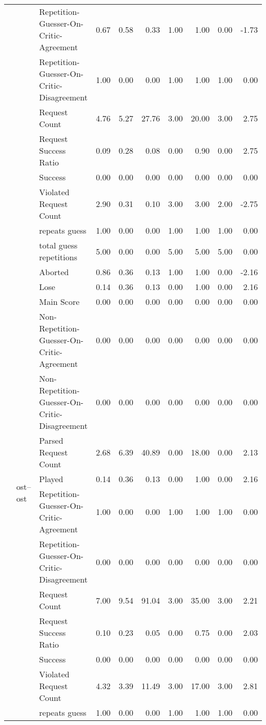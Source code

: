 \begin{tabular}{lllrrrrrrr}
 &  & Repetition-Guesser-On-Critic-Agreement & 0.67 & 0.58 & 0.33 & 1.00 & 1.00 & 0.00 & -1.73 \\
 &  & Repetition-Guesser-On-Critic-Disagreement & 1.00 & 0.00 & 0.00 & 1.00 & 1.00 & 1.00 & 0.00 \\
 &  & Request Count & 4.76 & 5.27 & 27.76 & 3.00 & 20.00 & 3.00 & 2.75 \\
 &  & Request Success Ratio & 0.09 & 0.28 & 0.08 & 0.00 & 0.90 & 0.00 & 2.75 \\
 &  & Success & 0.00 & 0.00 & 0.00 & 0.00 & 0.00 & 0.00 & 0.00 \\
 &  & Violated Request Count & 2.90 & 0.31 & 0.10 & 3.00 & 3.00 & 2.00 & -2.75 \\
 &  & repeats guess & 1.00 & 0.00 & 0.00 & 1.00 & 1.00 & 1.00 & 0.00 \\
 &  & total guess repetitions & 5.00 & 0.00 & 0.00 & 5.00 & 5.00 & 5.00 & 0.00 \\
\cline{2-10}
 & \multirow[t]{15}{*}{ost--ost} & Aborted & 0.86 & 0.36 & 0.13 & 1.00 & 1.00 & 0.00 & -2.16 \\
 &  & Lose & 0.14 & 0.36 & 0.13 & 0.00 & 1.00 & 0.00 & 2.16 \\
 &  & Main Score & 0.00 & 0.00 & 0.00 & 0.00 & 0.00 & 0.00 & 0.00 \\
 &  & Non-Repetition-Guesser-On-Critic-Agreement & 0.00 & 0.00 & 0.00 & 0.00 & 0.00 & 0.00 & 0.00 \\
 &  & Non-Repetition-Guesser-On-Critic-Disagreement & 0.00 & 0.00 & 0.00 & 0.00 & 0.00 & 0.00 & 0.00 \\
 &  & Parsed Request Count & 2.68 & 6.39 & 40.89 & 0.00 & 18.00 & 0.00 & 2.13 \\
 &  & Played & 0.14 & 0.36 & 0.13 & 0.00 & 1.00 & 0.00 & 2.16 \\
 &  & Repetition-Guesser-On-Critic-Agreement & 1.00 & 0.00 & 0.00 & 1.00 & 1.00 & 1.00 & 0.00 \\
 &  & Repetition-Guesser-On-Critic-Disagreement & 0.00 & 0.00 & 0.00 & 0.00 & 0.00 & 0.00 & 0.00 \\
 &  & Request Count & 7.00 & 9.54 & 91.04 & 3.00 & 35.00 & 3.00 & 2.21 \\
 &  & Request Success Ratio & 0.10 & 0.23 & 0.05 & 0.00 & 0.75 & 0.00 & 2.03 \\
 &  & Success & 0.00 & 0.00 & 0.00 & 0.00 & 0.00 & 0.00 & 0.00 \\
 &  & Violated Request Count & 4.32 & 3.39 & 11.49 & 3.00 & 17.00 & 3.00 & 2.81 \\
 &  & repeats guess & 1.00 & 0.00 & 0.00 & 1.00 & 1.00 & 1.00 & 0.00 \\

\end{tabular}
